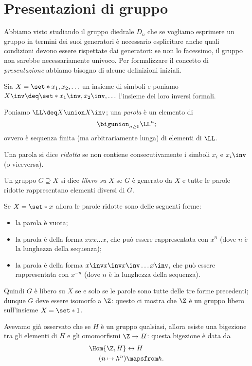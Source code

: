 \section{Presentazioni di gruppo}

Abbiamo visto studiando il gruppo diedrale $D_n$ che se vogliamo esprimere un gruppo in termini dei suoi generatori è necessario esplicitare anche quali condizioni devono essere rispettate dai generatori: se non lo facessimo, il gruppo non sarebbe necessariamente univoco. Per formalizzare il concetto di \emph{presentazione} abbiamo bisogno di alcune definizioni iniziali.

\begin{definition}
     Sia $X = \set*{x_1, x_2, \dots}$ un insieme di simboli e poniamo $X\inv \deq \set*{x_1\inv, x_2\inv, \dots}$ l'insieme dei loro inversi formali.

    Poniamo $\LL \deq X \union X\inv$; una \emph{parola} è un elemento di \[
        \bigunion_{n \geq 0} \LL^n;
    \] ovvero è sequenza finita (ma arbitrariamente lunga) di elementi di $\LL$.

    Una parola si dice \emph{ridotta} se non contiene consecutivamente i simboli $x_i$ e $x_i\inv$ (o viceversa).

    Un gruppo $G \supseteq X$ si dice \emph{libero su $X$} se $G$ è generato da $X$ e tutte le parole ridotte rappresentano elementi diversi di $G$.
\end{definition}

\begin{remark}
    Se $X = \set*{x}$ allora le parole ridotte sono delle seguenti forme:
    \begin{itemize}
        \item la parola è vuota;
        \item la parola è della forma $xxx\dots x$, che può essere rappresentata con $x^n$ (dove $n$ è la lunghezza della sequenza);
        \item la parola è della forma $x\inv x\inv x\inv \dots x\inv$, che può essere rappresentata con $x^{-n}$ (dove $n$ è la lunghezza della sequenza). 
    \end{itemize}

    Quindi $G$ è libero su $X$ se e solo se le parole sono tutte delle tre forme precedenti; dunque $G$ deve essere isomorfo a $\Z$: questo ci mostra che $\Z$ è un gruppo libero sull'insieme $X = \set*{1}$.
\end{remark}

Avevamo già osservato che se $H$ è un gruppo qualsiasi, allora esiste una bigezione tra gli elementi di $H$ e gli omomorfismi $\Z \to H$: questa bigezione è data da \begin{align*}
    \Hom{\Z, H} &\leftrightarrow H\\
    (n \mapsto h^n) &\mapsfrom h.
\end{align*}

